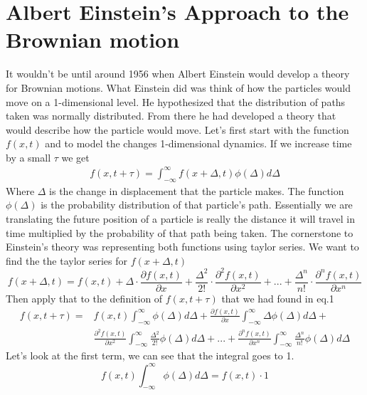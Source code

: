 \documentclass{article}
\begin{document}
\section*{Albert Einstein's Approach to the Brownian motion}
It wouldn't be until around 1956 when Albert Einstein would develop a theory for Brownian motions. What Einstein did was think of how the particles would move on a 1-dimensional level. He hypothesized that the distribution of paths taken was normally distributed. From there he had developed a theory that would describe how the particle would move. 
\newline
\newline
Let's first start with the function $f(x,t)$ and to model the changes 1-dimensional dynamics. If we increase time by a small $\tau$ we get
\begin{align}
    f(x,t+\tau) = \int_{-\infty}^\infty f(x + \Delta, t) \phi(\Delta) d\Delta
\end{align}
Where $\Delta$ is the change in displacement that the particle makes. The function $\phi(\Delta)$ is the probability distribution of that particle's path. Essentially we are translating the future position of a particle is really the distance it will travel in time multiplied by the probability of that path being taken. 
\newline
\newline
The cornerstone to Einstein's theory was representing both functions using taylor series. 
\newline
\newline
We want to find the the taylor series for $f(x + \Delta, t)$
$$
f(x + \Delta, t) = f(x,t) + \Delta \cdot \frac{\partial f(x,t)}{\partial x} + \frac{\Delta^2}{2!} \cdot \frac{\partial^2 f(x,t)}{\partial x^2} + ... + \frac{\Delta^n}{n!} \cdot \frac{\partial^n f(x,t)}{\partial x^n}
$$
Then apply that to the definition of $f(x,t + \tau)$ that we had found in eq.1
\begin{align*}
    f(x, t + \tau) = &f(x,t) \int_{-\infty}^\infty \phi(\Delta) d\Delta + \frac{\partial f(x,t)}{\partial x} \int_{-\infty}^{\infty} \Delta \phi(\Delta) d\Delta +\\
    & \frac{\partial^2 f(x,t)}{\partial x^2} \int_{-\infty}^{\infty} \frac{\Delta^2}{2!} \phi(\Delta) d\Delta + ...  + \frac{\partial^n f(x,t)}{\partial x^n} \int_{-\infty}^{\infty} \frac{\Delta^n}{n!} \phi(\Delta) d\Delta
\end{align*}
Let's look at the first term, we can see that the integral goes to 1. 
$$
f(x,t) \int_{-\infty}^\infty \phi(\Delta) d\Delta = f(x,t) \cdot 1
$$
\end{document}
